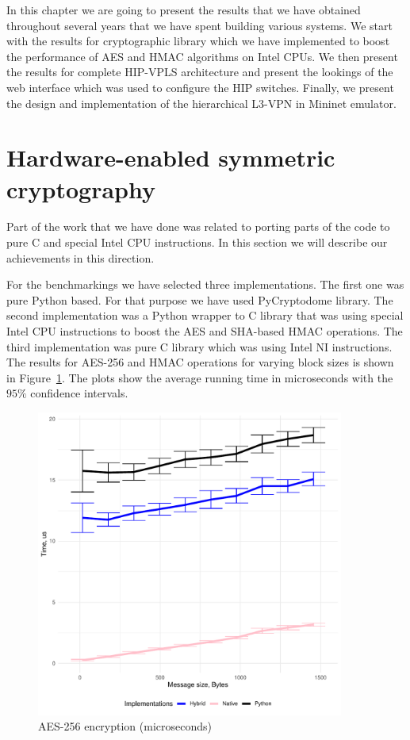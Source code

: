 In this chapter we are going to present the results that we have obtained 
throughout several years that we have spent building various systems. We start 
with the results for cryptographic library which we have implemented to 
boost the performance of AES and HMAC algorithms on Intel CPUs. We then 
present the results for complete HIP-VPLS architecture and present the 
lookings of the web interface which was used to configure the HIP switches.
Finally, we present the design and implementation of the hierarchical L3-VPN
in Mininet emulator.  

\section{Hardware-enabled symmetric cryptography}

Part of the work that we have done was related to porting parts of the code to pure C 
and special Intel CPU instructions. In this section we will describe our achievements 
in this direction. 

For the benchmarkings we have selected three implementations. The first one was pure 
Python based. For that purpose we have used PyCryptodome library. The second implementation
was a Python wrapper to C library that was using special Intel CPU instructions to boost 
the AES and SHA-based HMAC operations. The third implementation was pure C library 
which was using Intel NI instructions. The results for AES-256 and HMAC operations 
for varying block sizes is shown in Figure~\ref{}. The plots show the average 
running time in microseconds with the $95\%$ confidence intervals. 

\begin{figure}[h!]
    \centering
    \includegraphics[width=0.9\textwidth]{graphics/crypto/aes.pdf}
    \caption{AES-256 encryption (microseconds)}
    \label{fig:aes}
\end{figure}

